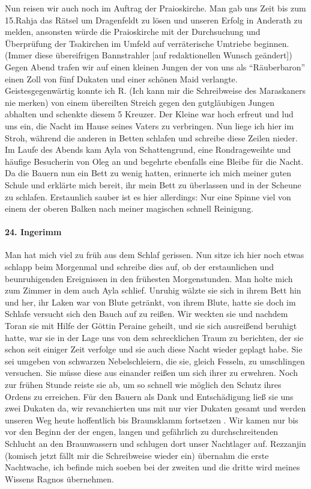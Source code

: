 Nun reisen wir auch noch im Auftrag der Praioskirche. Man gab uns Zeit bis zum 15.Rahja das Rätsel um Dragenfeldt  zu lösen und unseren Erfolg in Anderath zu melden, ansonsten würde die Praioskirche mit der Durchsuchung und Überprüfung der Tsakirchen im Umfeld auf verräterische Umtriebe beginnen. (Immer diese übereifrigen Bannstrahler [auf redaktionellen Wunsch geändert]) Gegen Abend trafen wir auf einen kleinen Jungen der von uns als ``Räuberbaron'' einen Zoll von fünf Dukaten und einer schönen Maid verlangte. Geistesgegenwärtig konnte ich R. (Ich kann mir die Schreibweise des Maraskaners nie merken) von einem übereilten Streich gegen den gutgläubigen Jungen abhalten und schenkte diesem 5 Kreuzer. Der Kleine war hoch erfreut und lud uns ein, die Nacht im Hause seines Vaters zu verbringen. Nun liege ich hier im Stroh, während die anderen in Betten schlafen und schreibe diese Zeilen nieder. Im Laufe des Abends kam Ayla von Schattengrund, eine Rondrageweihte und häufige Besucherin von Oleg an und begehrte ebenfalls eine Bleibe für die Nacht. Da die Bauern nun ein Bett zu wenig hatten, erinnerte ich mich meiner guten Schule und erklärte mich bereit, ihr mein Bett zu überlassen und in der Scheune zu schlafen. Erstaunlich sauber ist es hier allerdings: Nur eine Spinne viel von einem der oberen Balken nach meiner magischen schnell Reinigung.

\paragraph{24. Ingerimm}

Man hat mich viel zu früh aus dem Schlaf gerissen. Nun sitze ich hier noch etwas schlapp beim Morgenmal und schreibe dies auf, ob der erstaunlichen und beunruhigenden Ereignissen in den frühesten Morgenstunden. Man holte mich zum Zimmer in dem auch Ayla schlief. Unruhig wälzte sie sich in ihrem Bett hin und her, ihr Laken war von Blute getränkt, von ihrem Blute, hatte sie doch im Schlafe versucht sich den Bauch auf zu reißen. Wir weckten sie und nachdem Toran sie mit Hilfe der Göttin Peraine geheilt, und sie sich ausreißend beruhigt hatte, war sie in der Lage uns von dem schrecklichen Traum zu berichten, der sie schon seit einiger Zeit verfolge und sie auch diese Nacht wieder geplagt habe. Sie sei umgeben von schwarzen Nebelschleiern, die sie, gleich Fesseln, zu umschlingen versuchen. Sie müsse diese aus einander reißen um sich ihrer zu erwehren. Noch zur frühen Stunde reiste sie ab, um so schnell wie möglich den Schutz ihres Ordens zu erreichen. Für den Bauern als Dank und Entschädigung ließ sie uns zwei Dukaten da, wir revanchierten uns mit nur vier Dukaten gesamt und werden unseren Weg heute hoffentlich bis Braunsklamm fortsetzen .
Wir kamen nur bis vor den Beginn der der engen, langen und gefährlich zu durchschreitenden Schlucht an den Braunwassern und schlugen dort unser Nachtlager auf. Rezzanjin (komisch jetzt fällt mir die Schreibweise wieder ein) übernahm die erste Nachtwache, ich befinde mich soeben bei der zweiten und die dritte wird meines Wissens Ragnos übernehmen.

